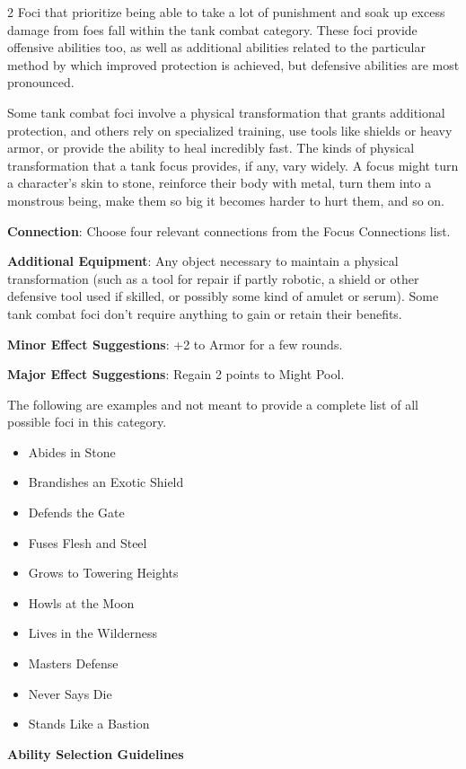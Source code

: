 \begin{multicols}{2}
Foci that prioritize being able to take a lot of punishment and soak up excess damage from foes fall within the tank combat category. These foci provide offensive abilities too, as well as additional abilities related to the particular method by which improved protection is achieved, but defensive abilities are most pronounced.

Some tank combat foci involve a physical transformation that grants additional protection, and others rely on specialized training, use tools like shields or heavy armor, or provide the ability to heal incredibly fast. The kinds of physical transformation that a tank focus provides, if any, vary widely. A focus might turn a character’s skin to stone, reinforce their body with metal, turn them into a monstrous being, make them so big it becomes harder to hurt them, and so on. 

\textbf{Connection}: Choose four relevant connections from the Focus Connections list. 

\textbf{Additional Equipment}: Any object necessary to maintain a physical transformation (such as a tool for repair if partly robotic, a shield or other defensive tool used if skilled, or possibly some kind of amulet or serum). Some tank combat foci don’t require anything to gain or retain their benefits.

\textbf{Minor Effect Suggestions}: +2 to Armor for a few rounds.

\textbf{Major Effect Suggestions}: Regain 2 points to Might Pool.

The following are examples and not meant to provide a complete list of all possible foci in this category.

\begin{itemize} 
\item Abides in Stone
\item Brandishes an Exotic Shield
\item Defends the Gate
\item Fuses Flesh and Steel
\item Grows to Towering Heights
\item Howls at the Moon
\item Lives in the Wilderness
\item Masters Defense
\item Never Says Die
\item Stands Like a Bastion
\end{itemize}

\textbf{Ability Selection Guidelines}


\end{multicols}
